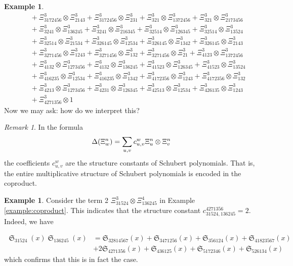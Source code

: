 \documentclass{amsart}
\theoremstyle{definition}
\newtheorem{example}[lemma]{Example}
\theoremstyle{remark}
\newtheorem*{remark}{Remark}
\numberwithin{equation}{subsection}
\DeclareMathOperator{\sch}{\mathfrak{S}}
\begin{document}
\begin{example}
\begin{align*}
&\quad + \Xi_{3172456}^{3} \otimes \Xi_{2143}^{3} + \Xi_{3172456}^{3} \otimes \Xi_{231}^{3} + \Xi_{321}^{3} \otimes \Xi_{1372456}^{3} + \Xi_{321}^{3} \otimes \Xi_{2173456}^{3} \\
&\quad + \Xi_{3241}^{3} \otimes \Xi_{136245}^{3} + \Xi_{3241}^{3} \otimes \Xi_{216345}^{3} + \Xi_{32514}^{3} \otimes \Xi_{126345}^{3} + \Xi_{32514}^{3} \otimes \Xi_{13524}^{3} \\
&\quad + \Xi_{32514}^{3} \otimes \Xi_{21534}^{3} + \Xi_{326145}^{3} \otimes \Xi_{12534}^{3} + \Xi_{326145}^{3} \otimes \Xi_{1342}^{3} + \Xi_{326145}^{3} \otimes \Xi_{2143}^{3} \\
&\quad + \Xi_{3271456}^{3} \otimes \Xi_{1243}^{3} + \Xi_{3271456}^{3} \otimes \Xi_{132}^{3} + \Xi_{3271456}^{3} \otimes \Xi_{21}^{3} + \Xi_{4123}^{3} \otimes \Xi_{1372456}^{3} \\
&\quad + \Xi_{4132}^{3} \otimes \Xi_{1273456}^{3} + \Xi_{4132}^{3} \otimes \Xi_{136245}^{3} + \Xi_{41523}^{3} \otimes \Xi_{126345}^{3} + \Xi_{41523}^{3} \otimes \Xi_{13524}^{3} \\
&\quad + \Xi_{416235}^{3} \otimes \Xi_{12534}^{3} + \Xi_{416235}^{3} \otimes \Xi_{1342}^{3} + \Xi_{4172356}^{3} \otimes \Xi_{1243}^{3} + \Xi_{4172356}^{3} \otimes \Xi_{132}^{3} \\
&\quad + \Xi_{4213}^{3} \otimes \Xi_{1273456}^{3} + \Xi_{4231}^{3} \otimes \Xi_{126345}^{3} + \Xi_{42513}^{3} \otimes \Xi_{12534}^{3} + \Xi_{426135}^{3} \otimes \Xi_{1243}^{3} \\
&\quad + \Xi_{4271356}^{3} \otimes 1
\end{align*}
Now we may ask: how do we interpret this?
\end{example}

\begin{remark}
In the formula
$$\Delta(\Xi_w^n) = \sum_{u,v} c_{u,v}^w\Xi_u^n\otimes \Xi_v^n$$
the coefficients $c_{u,v}^w$ are the structure constants of Schubert polynomials. That is, the entire multiplicative structure of Schubert polynomials is encoded in the coproduct.
\end{remark}

\begin{example}
Consider the term 2 $\Xi_{31524}^{3} \otimes \Xi_{136245}^{4}$ in Example \ref{example:coproduct}. This indicates that the structure constant $c_{31524,136245}^{4271356}=2$. Indeed, we have

\begin{align*}
\sch_{31524}(x)\sch_{136245}(x)&=\mathfrak{S}_{3  2  8  1  4  5  6  7}{\left(x \right)} + \mathfrak{S}_{3  4  7  1  2  5  6}{\left(x \right)} + \mathfrak{S}_{3  5  6  1  2  4}{\left(x \right)} + \mathfrak{S}_{4  1  8  2  3  5  6  7}{\left(x \right)} \\
&+ 2 \mathfrak{S}_{4  2  7  1  3  5  6}{\left(x \right)} + \mathfrak{S}_{4  3  6  1  2  5}{\left(x \right)} + \mathfrak{S}_{5  1  7  2  3  4  6}{\left(x \right)}+ \mathfrak{S}_{5  2  6  1  3  4}{\left(x \right)}
\end{align*}
which confirms that this is in fact the case.
\end{example}



\end{document}
